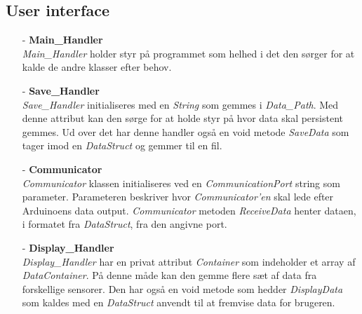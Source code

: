 \subsection{User interface}
\begin{itemize}
    \item [-] \textbf{Main\_Handler} \hfill \\
    \textit{Main\_Handler} holder styr på programmet som helhed i det den sørger for at kalde de andre klasser efter behov.
    
    \item [-] \textbf{Save\_Handler} \hfill \\
    \textit{Save\_Handler} initialiseres med en \textit{String} som gemmes i \textit{Data\_Path}. Med denne attribut kan den sørge for at holde styr på hvor data skal persistent gemmes. Ud over det har denne handler også en void metode \textit{SaveData} som tager imod en \textit{DataStruct} og gemmer til en fil. 
    
    \item [-] \textbf{Communicator} \hfill \\
    \textit{Communicator} klassen initialiseres ved en \textit{CommunicationPort} string som parameter. Parameteren beskriver hvor \textit{Communicator'en} skal lede efter Arduinoens data output. \textit{Communicator} metoden \textit{ReceiveData} henter dataen, i formatet fra \textit{DataStruct}, fra den angivne port.
    
    \item [-] \textbf{Display\_Handler} \hfill \\
    \textit{Display\_Handler} har en privat attribut \textit{Container} som indeholder et array af \textit{DataContainer}. På denne måde kan den gemme flere sæt af data fra forskellige sensorer. Den har også en void metode som hedder \textit{DisplayData} som kaldes med en \textit{DataStruct} anvendt til at fremvise data for brugeren.
\end{itemize}

